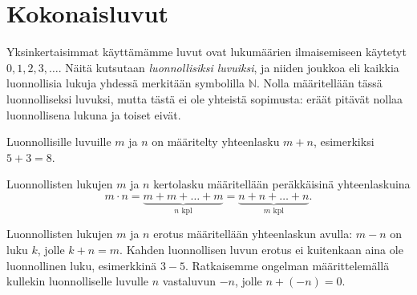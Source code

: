 
% 
% 
% 


% 
% 
% 

\chapter{Kokonaisluvut}

Yksinkertaisimmat käyttämämme luvut ovat lukumäärien ilmaisemiseen käytetyt $0, 1, 2, 3, \ldots$. Näitä kutsutaan \emph{luonnollisiksi luvuiksi}, ja niiden joukkoa eli kaikkia luonnollisia lukuja yhdessä merkitään symbolilla $\mathbb{N}$.
Nolla määritellään tässä luonnolliseksi luvuksi, mutta tästä ei ole yhteistä sopimusta: eräät pitävät nollaa luonnollisena lukuna ja toiset eivät.

Luonnollisille luvuille $m$ ja $n$ on määritelty yhteenlasku $m + n$, esimerkiksi $5 + 3 = 8$.

Luonnollisten lukujen $m$ ja $n$ kertolasku määritellään peräkkäisinä yhteenlaskuina
\[m \cdot n = \underbrace{m + m + \ldots + m}_{n\text{ kpl}} = \underbrace{n + n + \ldots + n}_{m\text{ kpl}}.\]


Luonnollisten lukujen $m$ ja $n$ erotus määritellään yhteenlaskun avulla:
$m-n$ on luku $k$, jolle $k + n = m$. Kahden luonnollisen luvun erotus
ei kuitenkaan aina ole luonnollinen luku, esimerkkinä $3 - 5$.
Ratkaisemme ongelman määrittelemällä kullekin luonnolliselle
luvulle $n$ vastaluvun $-n$, jolle $n + (-n) = 0$.

